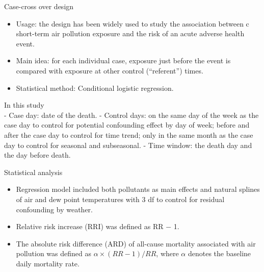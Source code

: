\documentclass[ignorenonframetext,]{beamer}
\providecommand{\tightlist}{%
  \setlength{\itemsep}{0pt}\setlength{\parskip}{0pt}}
\begin{document}
\begin{frame}{Case-cross over design}

\begin{itemize}
\tightlist
\item
  Usage: the design has been widely used to study the association
  between c short-term air pollution exposure and the risk of an acute
  adverse health event.
\item
  Main idea: for each individual case, exposure just before the event is
  compared with exposure at other control (``referent'') times.
\item
  Statistical method: Conditional logistic regression.
\end{itemize}

In this study\\
- Case day: date of the death. - Control days: on the same day of the
week as the case day to control for potential confounding effect by day
of week; before and after the case day to control for time trend; only
in the same month as the case day to control for seasonal and
subseasonal. - Time window: the death day and the day before death.

\end{frame}

\begin{frame}{Statistical analysis}

\begin{itemize}
\tightlist
\item
  Regression model included both pollutants as main effects and natural
  splines of air and dew point temperatures with 3 df to control for
  residual confounding by weather.
\item
  Relative risk increase (RRI) was defined as RR − 1.
\item
  The absolute risk difference (ARD) of all-cause mortality associated
  with air pollution was defined as \(\alpha \times (RR - 1)/RR\), where
  \(\alpha\) denotes the baseline daily mortality rate.
\end{itemize}

\end{frame}
\end{document}
